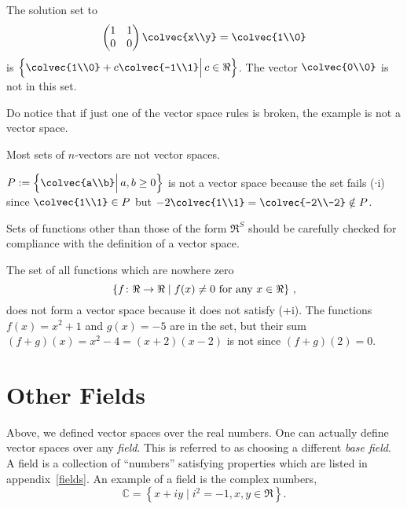 \begin{example} 
The solution set to 
\[  \begin{pmatrix}
      1 & 1 \\
      0 & 0 
    \end{pmatrix} \colvec{x\\y} = \colvec{1\\0} \]
is  $\left\{ \colvec{1\\0} + c \colvec{-1\\1} \Big|\, c \in \Re \right\}$.
The vector $\colvec{0\\0}$ is not in this set.
\end{example}
Do notice that if just one of the vector space rules is broken, the example is not a vector space.

Most sets of $n$-vectors are not vector spaces. 
\begin{example} 
$P:=\left \{ \colvec{a\\b} \Big| \,a,b \geq 0 \right\}$ is not a vector space because the set fails ($\cdot$i) since 
$\colvec{1\\1}\in P$ but $-2\colvec{1\\1} =\colvec{-2\\-2} \notin P$.
\end{example}


Sets of functions other than those of the form $\Re^S$ should be carefully checked for compliance with the definition of a vector space.


\begin{example}
The set of all functions which are nowhere zero 
\[\left\{ f \colon \Re\rightarrow \Re \mid f(x)\neq 0 {\rm ~for~any}~x\in\Re \right\}\, ,\]
does not form a vector space because it does not satisfy (+i). The functions $f(x)=x^2+1$ and $g(x)= -5$ are in the set, but their sum $(f+g)(x)=x^2-4=(x+2)(x-2)$ is not since $(f+g)(2)=0$.
\end{example}


\section{Other Fields} \label{otherfields}
Above, we defined vector spaces over the real numbers.  One can actually define vector spaces over any \emph{field}.
This is referred to as choosing a different {\itshape base field}.
  A field is a collection of ``numbers'' satisfying  properties which are listed in appendix~\ref{fields}.
An example of a field is the complex numbers, 
\[
\mathbb{C}= \left\{x+iy \mid i^2=-1, x,y\in \Re \right\}.
\]

